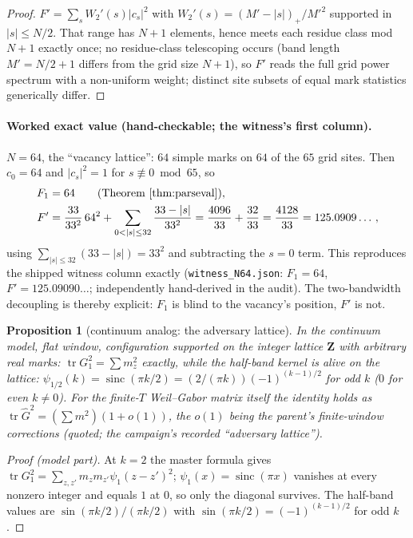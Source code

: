 \documentclass[11pt]{article}
\theoremstyle{plain}
\newtheorem{proposition}[theorem]{Proposition}
\theoremstyle{definition}
\theoremstyle{remark}
\newcommand{\Z}{\mathbf{Z}}
\newcommand{\Gh}{\widehat{G}}
\newcommand{\tr}{\operatorname{tr}}
\newcommand{\sinc}{\operatorname{sinc}}
\begin{document}
\begin{proof}
$F' = \sum_s W_2'(s) |c_s|^2$ with $W_2'(s) = (M' - |s|)_+/M'^2$ supported in
$|s| \le N/2$. That range has $N + 1$ elements, hence meets each residue class
mod $N + 1$ exactly once; no residue-class telescoping occurs (band length
$M' = N/2 + 1$ differs from the grid size $N + 1$), so $F'$ reads the full grid
power spectrum with a non-uniform weight; distinct site subsets of equal mark
statistics generically differ.
\end{proof}

\paragraph{Worked exact value (hand-checkable; the witness's first column).}
$N = 64$, the ``vacancy lattice'': $64$ simple marks on $64$ of the $65$ grid
sites. Then $c_0 = 64$ and $|c_s|^2 = 1$ for $s \not\equiv 0 \bmod 65$, so
\begin{align*}
  F_1 &= 64 \qquad (\text{Theorem~\ref{thm:parseval}}),\\
  F' &= \frac{33}{33^2}\, 64^2
    + \sum_{0 < |s| \le 32} \frac{33 - |s|}{33^2}
    = \frac{4096}{33} + \frac{32}{33}
    = \frac{4128}{33} = 125.0909\ldots \,,
\end{align*}
using $\sum_{|s| \le 32} (33 - |s|) = 33^2$ and subtracting the $s = 0$ term.
This reproduces the shipped witness column exactly
(\texttt{witness\_N64.json}: $F_1 = 64$, $F' = 125.09090\ldots$; independently
hand-derived in the audit). The two-bandwidth decoupling is thereby explicit:
$F_1$ is blind to the vacancy's position, $F'$ is not.

\begin{proposition}[continuum analog: the adversary lattice]
\label{prop:lattice}
In the continuum model, flat window, configuration supported on the integer
lattice $\Z$ with arbitrary real marks: $\tr G_1^2 = \sum m_z^2$ exactly, while
the half-band kernel is alive on the lattice:
$\psi_{1/2}(k) = \sinc(\pi k/2) = (2/(\pi k))(-1)^{(k-1)/2}$ for odd $k$ ($0$ for
even $k \ne 0$). For the finite-$T$ Weil--Gabor matrix itself the identity holds
as $\tr \Gh^2 = (\sum m^2)(1 + o(1))$, the $o(1)$ being the parent's
finite-window corrections (quoted; the campaign's recorded ``adversary
lattice'').
\end{proposition}

\begin{proof}[Proof (model part)]
At $k = 2$ the master formula gives
$\tr G_1^2 = \sum_{z, z'} m_z m_{z'} \psi_1(z - z')^2$;
$\psi_1(x) = \sinc(\pi x)$ vanishes at every nonzero integer and equals $1$ at
$0$, so only the diagonal survives. The half-band values are
$\sin(\pi k/2)/(\pi k/2)$ with $\sin(\pi k/2) = (-1)^{(k-1)/2}$ for odd $k$.
\end{proof}
\end{document}
